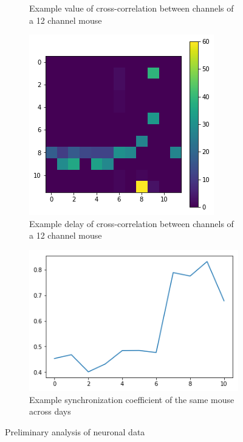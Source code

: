 \documentclass[a4paper,10pt]{article}
\begin{document}
\begin{figure}
\begin{subfigure}[b]{0.4\textwidth}
        \caption{Example value of cross-correlation between channels of a 12 channel mouse}
        \label{fig:prelim_crosscorr_val}
    \end{subfigure}
    \begin{subfigure}[b]{0.4\textwidth}
        \includegraphics[width=\textwidth]{img/example_neuro_crosscorr_delays.png}
        \caption{Example delay of cross-correlation between channels of a 12 channel mouse}
        \label{fig:prelim_crosscorr_del}
    \end{subfigure}\hspace{0.05\textwidth}
    \begin{subfigure}[b]{0.4\textwidth}
        \includegraphics[width=\textwidth]{img/example_neuro_synchr_by_days.png}
        \caption{Example synchronization coefficient of the same mouse across days}
        \label{fig:prelim_synchr}
    \end{subfigure}
    \caption{Preliminary analysis of neuronal data}\label{fig:prelim_analysis_1}
\end{figure}
\end{document}
